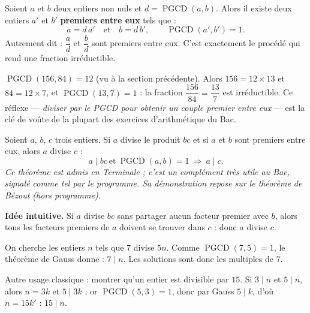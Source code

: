 \documentclass[11pt]{article}
\newcounter{popsec}
\newcounter{popsub}
\newcommand{\courssub}[1]{%
  \stepcounter{popsub}%
  \par\vspace{9pt}\noindent{\popxbold\fontsize{11.5}{13}\selectfont\color{popink}{\color{poporange}\thepopsec.\thepopsub}\hspace{6pt}#1}\par\nopagebreak\vspace{4pt}
}
\begin{document}
\begin{propriete}
Soient $a$ et $b$ deux entiers non nuls et $d = \operatorname{PGCD}(a,b)$. Alors il existe deux entiers $a'$ et $b'$ \textbf{premiers entre eux} tels que :
\[ a = d\,a' \quad \text{et} \quad b = d\,b', \qquad \operatorname{PGCD}(a',b') = 1. \]
Autrement dit : $\dfrac{a}{d}$ et $\dfrac{b}{d}$ sont premiers entre eux. C'est exactement le procédé qui rend une fraction irréductible.
\end{propriete}

\begin{exemplebox}
$\operatorname{PGCD}(156, 84) = 12$ (vu à la section précédente). Alors $156 = 12 \times 13$ et $84 = 12 \times 7$, et $\operatorname{PGCD}(13,7)=1$ : la fraction $\dfrac{156}{84} = \dfrac{13}{7}$ est irréductible. Ce réflexe — \emph{diviser par le PGCD pour obtenir un couple premier entre eux} — est la clé de voûte de la plupart des exercices d'arithmétique du Bac.
\end{exemplebox}

\courssub{Le théorème de Gauss}

\begin{propriete}
Soient $a$, $b$, $c$ trois entiers. Si $a$ divise le produit $bc$ et si $a$ et $b$ sont premiers entre eux, alors $a$ divise $c$ :
\[ a \mid bc \ \text{et}\ \operatorname{PGCD}(a,b)=1 \ \Longrightarrow\ a \mid c. \]
\emph{Ce théorème est admis en Terminale ; c'est un complément très utile au Bac, signalé comme tel par le programme. Sa démonstration repose sur le théorème de Bézout (hors programme).}
\end{propriete}

\textbf{Idée intuitive.} Si $a$ divise $bc$ sans partager aucun facteur premier avec $b$, alors tous les facteurs premiers de $a$ doivent se trouver dans $c$ : donc $a$ divise $c$.

\begin{exemplebox}
On cherche les entiers $n$ tels que $7$ divise $5n$. Comme $\operatorname{PGCD}(7,5)=1$, le théorème de Gauss donne : $7 \mid n$. Les solutions sont donc les multiples de $7$.

Autre usage classique : montrer qu'un entier est divisible par $15$. Si $3 \mid n$ et $5 \mid n$, alors $n = 3k$ et $5 \mid 3k$ ; or $\operatorname{PGCD}(5,3)=1$, donc par Gauss $5 \mid k$, d'où $n = 15k'$ : $15 \mid n$.
\end{exemplebox}
\end{document}
